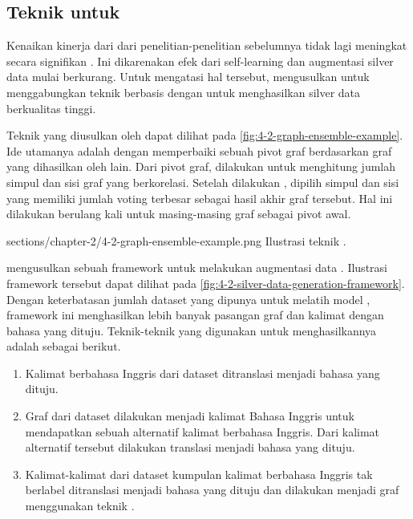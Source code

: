 \subsection{Teknik  untuk \amrparsing{}}

Kenaikan kinerja dari \amrparsing{} dari penelitian-penelitian sebelumnya tidak lagi meningkat secara signifikan .
Ini dikarenakan efek dari self-learning dan augmentasi silver data mulai berkurang.
Untuk mengatasi hal tersebut, \textcite{lee2022} mengusulkan untuk menggabungkan teknik  berbasis \SMATCH{}  dengan  untuk menghasilkan silver data berkualitas tinggi.

Teknik  yang diusulkan oleh \textcite{hoang2021} dapat dilihat pada \cref{fig:4-2-graph-ensemble-example}.
Ide utamanya adalah dengan memperbaiki sebuah pivot graf berdasarkan graf yang dihasilkan oleh  lain.
Dari pivot graf, dilakukan  untuk menghitung jumlah simpul dan sisi graf yang berkorelasi.
Setelah dilakukan , dipilih simpul dan sisi yang memiliki jumlah voting terbesar sebagai hasil akhir graf tersebut.
Hal ini dilakukan berulang kali untuk masing-masing graf sebagai pivot awal.

  {sections/chapter-2/4-2-graph-ensemble-example.png}
  {Ilustrasi teknik  .}

\textcite{lee2022} mengusulkan sebuah framework untuk melakukan augmentasi data \AMR{}.
Ilustrasi framework tersebut dapat dilihat pada \cref{fig:4-2-silver-data-generation-framework}.
Dengan keterbatasan jumlah dataset yang dipunya untuk melatih model , framework ini menghasilkan lebih banyak pasangan graf \AMR{} dan kalimat dengan bahasa yang dituju.
Teknik-teknik yang digunakan untuk menghasilkannya adalah sebagai berikut.
\begin{enumerate}
  \item Kalimat berbahasa Inggris dari dataset \AMR{} ditranslasi menjadi bahasa yang dituju.

  \item Graf \AMR{} dari dataset \AMR{} dilakukan  menjadi kalimat Bahasa Inggris untuk mendapatkan sebuah alternatif kalimat berbahasa Inggris.
  Dari kalimat alternatif tersebut dilakukan translasi menjadi bahasa yang dituju.

  \item Kalimat-kalimat dari dataset kumpulan kalimat berbahasa Inggris tak berlabel ditranslasi menjadi bahasa yang dituju dan dilakukan  menjadi graf \AMR{} menggunakan teknik .
\end{enumerate}

